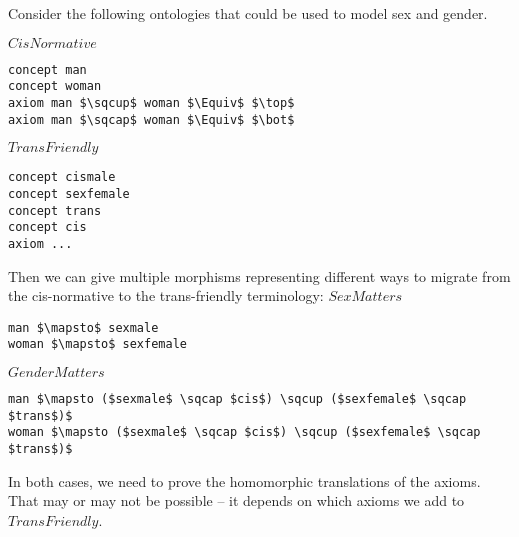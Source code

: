 \begin{example}
Consider the following ontologies that could be used to model sex and gender.

$CisNormative$
\begin{lstlisting}
concept man
concept woman
axiom man $\sqcup$ woman $\Equiv$ $\top$
axiom man $\sqcap$ woman $\Equiv$ $\bot$
\end{lstlisting}

$TransFriendly$
\begin{lstlisting}
concept cismale
concept sexfemale
concept trans
concept cis
axiom ...
\end{lstlisting}

Then we can give multiple morphisms representing different ways to migrate from the cis-normative to the trans-friendly terminology:
$SexMatters$
\begin{lstlisting}
man $\mapsto$ sexmale
woman $\mapsto$ sexfemale
\end{lstlisting}

$GenderMatters$
\begin{lstlisting}
man $\mapsto ($sexmale$ \sqcap $cis$) \sqcup ($sexfemale$ \sqcap $trans$)$
woman $\mapsto ($sexmale$ \sqcap $cis$) \sqcup ($sexfemale$ \sqcap $trans$)$
\end{lstlisting}

In both cases, we need to prove the homomorphic translations of the axioms.
That may or may not be possible -- it depends on which axioms we add to $TransFriendly$.
\end{example}